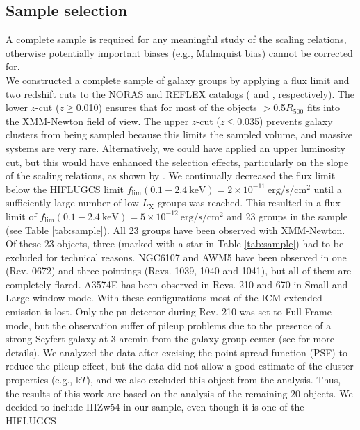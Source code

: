\documentclass{aa} %
\begin{document}
\subsection{Sample selection}
A complete sample is required for any meaningful study of the scaling
relations, otherwise potentially important biases (e.g., Malmquist
bias) cannot be corrected for.\\
We constructed a complete sample of galaxy groups by applying a flux
limit and two redshift cuts to the NORAS and REFLEX catalogs
(\citealt{2000ApJS..129..435B} and \citealt{2004A&A...425..367B},
respectively). The lower $z$-cut ({\it z}$\ge$0.010) ensures that for most of the objects
$>$0.5$R_{\text{500}}$ fits into the XMM-Newton field of view. The upper $z$-cut ({\it z}$\le$0.035)
prevents galaxy clusters from being sampled because this limits the sampled volume, and massive systems are very rare. Alternatively, we could have applied an upper luminosity cut, but this would have enhanced the selection effects, particularly on the slope of the scaling relations, as shown by \citet{2011A&A...535A.105E}.  We continually decreased the
flux limit below the HIFLUGCS limit $f_{\text{lim}} (0.1-2.4 \ \text{keV}) =
2\times10^{-11} \ \text{erg/s/cm$^{2}$}$ until a sufficiently large number of low
$L_\text{X}$ groups was reached. This resulted in a flux limit of $f_{\text{lim}}
(0.1-2.4 \ \text{keV}) = 5\times10^{-12} \ \text{erg/s/cm$^{2}$}$ and 23 groups in the
sample (see Table \ref{tab:sample}). All 23 groups have been observed with XMM-Newton. Of these 23 objects, three 
(marked with a star in Table \ref{tab:sample}) had to be excluded for
technical reasons. NGC6107 and AWM5 have been observed in one
(Rev. 0672) and three pointings (Revs. 1039, 1040 and 1041),
 but all of them are completely flared. A3574E has been
observed in Revs. 210 and 670 in Small and Large window mode. With
these configurations most of the ICM extended emission is lost. Only
the pn detector during Rev. 210 was set to Full Frame mode, but the
observation suffer of pileup problems due to the presence of a strong
Seyfert galaxy at 3 arcmin from the galaxy group center (see
\citealt{2004A&A...422...65B} for more details). We analyzed
the data after excising the point spread function (PSF) to reduce the pileup effect, but the
data did not allow a good estimate of the cluster properties (e.g., k$T$), and we
 also excluded this object from the analysis. Thus, the results of this
work are based on the analysis of the remaining 20 objects. We decided
to include IIIZw54 in our sample, even though it is one of the HIFLUGCS
\end{document}
